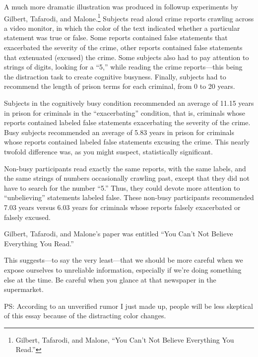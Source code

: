 {
 A much more dramatic illustration was produced in followup
experiments by Gilbert, Tafarodi, and Malone.\footnote{Gilbert, Tafarodi, and Malone, ``You
Can't Not Believe Everything You
Read.''}
Subjects read aloud crime reports crawling across a video monitor, in
which the color of the text indicated whether a particular statement
was true or false. Some reports contained false statements that
exacerbated the severity of the crime, other reports contained false
statements that extenuated (excused) the crime. Some subjects also had
to pay attention to strings of digits, looking for a
``5,'' while reading the crime
reports---this being the distraction task to create cognitive busyness.
Finally, subjects had to recommend the length of prison terms for each
criminal, from 0 to 20 years.}

{
 Subjects in the cognitively busy condition recommended an average
of 11.15 years in prison for criminals in the
``exacerbating'' condition, that is,
criminals whose reports contained labeled false statements exacerbating
the severity of the crime. Busy subjects recommended an average of 5.83
years in prison for criminals whose reports contained labeled false
statements excusing the crime. This nearly twofold difference was, as
you might suspect, statistically significant.}

{
 Non-busy participants read exactly the same reports, with the same
labels, and the same strings of numbers occasionally crawling past,
except that they did not have to search for the number
``5.'' Thus, they could devote more
attention to ``unbelieving''
statements labeled false. These non-busy participants recommended 7.03
years versus 6.03 years for criminals whose reports falsely exacerbated
or falsely excused.}

{
 Gilbert, Tafarodi, and Malone's paper was entitled
``You Can't Not Believe Everything You
Read.''}

{
 This suggests---to say the very least---that we should be more
careful when we expose ourselves to unreliable information, especially
if we're doing something else at the time. Be careful
when you glance at that newspaper in the supermarket.}

{
 PS: According to an unverified rumor I just made up, people will
be less skeptical of this essay because of the distracting color
changes.}

\myendsectiontext


\bigskip


